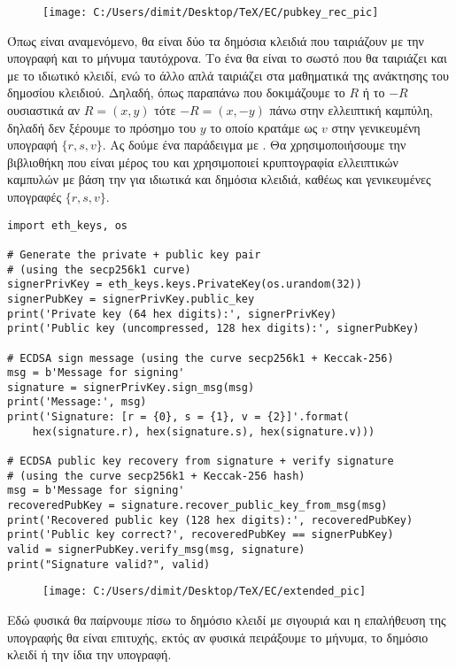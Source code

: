 \documentclass[oneside,a4paper]{article}
\begin{document}
\begin{figure}[H]
	\centering
	\texttt{[image: C:/Users/dimit/Desktop/TeX/EC/pubkey\_rec\_pic]}
\end{figure}


Όπως είναι αναμενόμενο, θα είναι δύο τα δημόσια κλειδιά που ταιριάζουν με την υπογραφή και το μήνυμα ταυτόχρονα. Το ένα θα είναι το σωστό που θα ταιριάζει και με το ιδιωτικό κλειδί, ενώ το άλλο απλά ταιριάζει στα μαθηματικά της ανάκτησης του δημοσίου κλειδιού. Δηλαδή, όπως παραπάνω που δοκιμάζουμε το $R$ ή το $-R$ ουσιαστικά αν $R= (x,y)$ τότε $-R  =(x,-y)$ πάνω στην ελλειπτική καμπύλη, δηλαδή δεν ξέρουμε το πρόσημο του $y$ το οποίο κρατάμε ως $v$ στην γενικευμένη υπογραφή $\{r,s,v\}$. Ας δούμε ένα παράδειγμα με . Θα χρησιμοποιήσουμε την βιβλιοθήκη  που είναι μέρος του  και χρησιμοποιεί κρυπτογραφία ελλειπτικών καμπυλών με βάση την  για ιδιωτικά και δημόσια κλειδιά, καθέως και γενικευμένες  υπογραφές $\{r,s,v\}$.
\begin{lstlisting}
import eth_keys, os

# Generate the private + public key pair
# (using the secp256k1 curve)
signerPrivKey = eth_keys.keys.PrivateKey(os.urandom(32))
signerPubKey = signerPrivKey.public_key
print('Private key (64 hex digits):', signerPrivKey)
print('Public key (uncompressed, 128 hex digits):', signerPubKey)

# ECDSA sign message (using the curve secp256k1 + Keccak-256)
msg = b'Message for signing'
signature = signerPrivKey.sign_msg(msg)
print('Message:', msg)
print('Signature: [r = {0}, s = {1}, v = {2}]'.format(
    hex(signature.r), hex(signature.s), hex(signature.v)))

# ECDSA public key recovery from signature + verify signature
# (using the curve secp256k1 + Keccak-256 hash)
msg = b'Message for signing'
recoveredPubKey = signature.recover_public_key_from_msg(msg)
print('Recovered public key (128 hex digits):', recoveredPubKey)
print('Public key correct?', recoveredPubKey == signerPubKey)
valid = signerPubKey.verify_msg(msg, signature)
print("Signature valid?", valid)
\end{lstlisting}

\begin{figure}[H]
	\centering
	\texttt{[image: C:/Users/dimit/Desktop/TeX/EC/extended\_pic]}
\end{figure}

Εδώ φυσικά θα παίρνουμε πίσω το δημόσιο κλειδί με σιγουριά και η επαλήθευση της υπογραφής θα είναι επιτυχής, εκτός αν φυσικά πειράξουμε το μήνυμα, το δημόσιο κλειδί ή την ίδια την υπογραφή.
\end{document}
